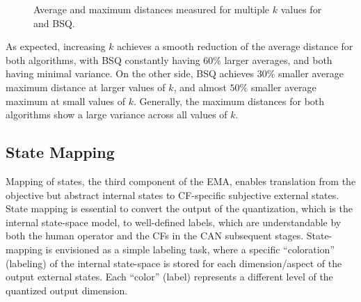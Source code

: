 			\begin{figure}[ht]
				\centering
				\caption[\kmeans{} and BSQ average and maximum distances]{Average and maximum distances measured for multiple $k$ values for \kmeans{} and BSQ.}
				\label{fig:quant_distances}
			\end{figure}
			
			As expected, increasing $k$ achieves a smooth reduction of the average distance for both algorithms, with \ac{BSQ} constantly having $60\%$ larger averages, and both having minimal variance.
			On the other side, \ac{BSQ} achieves $30\%$ smaller average maximum distance at larger values of $k$, and almost $50\%$ smaller average maximum at small values of $k$.
			Generally, the maximum distances for both algorithms show a large variance across all values of $k$.			
		
		\subsection{State Mapping}
			\label{cha:ema:sec:mapping}
		
			Mapping of states, the third component of the \ac{EMA}, enables translation from the objective but abstract internal states to \ac{CF}-specific subjective external states.
			State mapping is essential to convert the output of the quantization, which is the internal state-space model, to well-defined labels, which are understandable by both the human operator and the \acp{CF} in the \ac{CAN} subsequent stages.
			State-mapping is envisioned as a simple labeling task, where a specific ``coloration'' (labeling) of the internal state-space is stored for each dimension/aspect of the output external states.
			Each ``color'' (label) represents a different level of the quantized output dimension.
			
